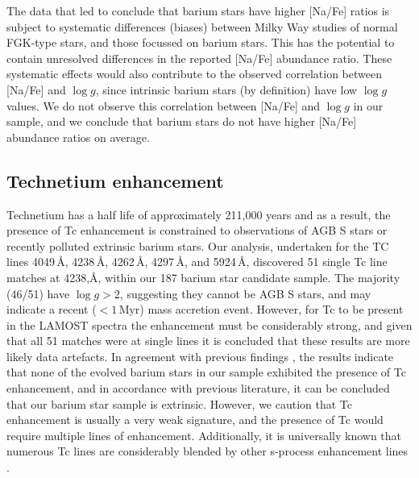 \documentclass[a4paper,fleqn,usenatbib]{mnras}
\begin{document}
The data that led \citet{decastro2016} to conclude that barium stars have higher [Na/Fe] ratios is subject to systematic differences (biases) between Milky Way studies of normal FGK-type stars, and those focussed on barium stars. This has the potential to contain unresolved differences in the reported [Na/Fe] abundance ratio. These systematic effects would also contribute to the observed correlation between [Na/Fe] and $\log{g}$, since intrinsic barium stars (by definition) have low $\log{g}$ values. We do not observe this correlation between [Na/Fe] and $\log{g}$ in our sample, and we conclude that barium stars do not have higher [Na/Fe] abundance ratios on average.

\subsection{Technetium enhancement}

Technetium has a half life of approximately 211,000 years and as a result, the presence of Tc enhancement is constrained to observations of AGB S stars \citep{jorissen1993} or recently polluted extrinsic barium stars. Our analysis, undertaken for the TC lines 4049\,\AA, 4238\,\AA, 4262\,\AA, 4297\,\AA, and 5924\,\AA, discovered 51 single Tc line matches at 4238,\AA, within our 187 barium star candidate sample. The majority (46/51) have $\log{g} > 2$, suggesting they cannot be AGB S stars, and may indicate a recent ($<1\,\textrm{Myr}$) mass accretion event. However, for Tc to be present in the LAMOST spectra the enhancement must be considerably strong, and given that all 51 matches were at single lines it is concluded that these results are more likely data artefacts. In agreement with previous findings \citep[e.g.,][]{little1987,smith1984,smith1983}, the results indicate that none of the evolved barium stars in our sample exhibited the presence of Tc enhancement, and in accordance with previous literature, it can be concluded that our barium star sample is extrinsic. However, we caution that Tc enhancement is usually a very weak signature, and the presence of Tc would require multiple lines of enhancement. Additionally, it is universally known that numerous Tc lines are considerably blended by other s-process enhancement lines \citep[e.g.,][]{van1999}. 
\end{document}
